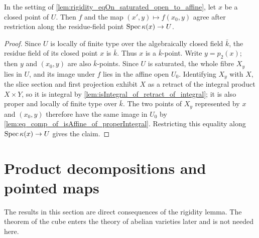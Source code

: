 \begin{lemma}
  \label{lem:rigidity_eqAt_closedPoint_of_proper_into_affine}
  \leanok
  In the setting of
  \cref{lem:rigidity_eqOn_saturated_open_to_affine}, let \(x\) be a closed point of
  \(U\).  Then \(f\) and the map \((x',y)\mapsto f(x_0,y)\) agree after restriction
  along the residue-field point \(\operatorname{Spec}\kappa(x)\to U\).
\end{lemma}
\begin{proof}
  \leanok
  Since \(U\) is locally of finite type over the algebraically closed field \(\bar k\),
  the residue field of its closed point \(x\) is \(\bar k\).  Thus \(x\) is a
  \(\bar k\)-point.  Write \(y=p_2(x)\); then \(y\) and \((x_0,y)\) are also
  \(\bar k\)-points.  Since \(U\) is saturated, the whole fibre \(X_y\) lies in
  \(U\), and its image under \(f\) lies in the affine open \(U_0\).  Identifying
  \(X_y\) with \(X\), the slice section and first projection exhibit \(X\) as a
  retract of the integral product \(X\times Y\), so it is integral by
  \cref{lem:isIntegral_of_retract_of_integral}; it is also proper and locally of
  finite type over \(\bar k\).  The two points of \(X_y\) represented by \(x\) and
  \((x_0,y)\) therefore have the same image in \(U_0\) by
  \cref{lem:eq_comp_of_isAffine_of_properIntegral}.  Restricting this equality along
  \(\operatorname{Spec}\kappa(x)\to U\) gives the claim.
\end{proof}

\section{Product decompositions and pointed maps}

\begin{remark}
  \label{rmk:cube_not_needed}
  The results in this section are direct consequences of the rigidity lemma.  The theorem
  of the cube enters the theory of abelian varieties later and is not needed here.
\end{remark}

